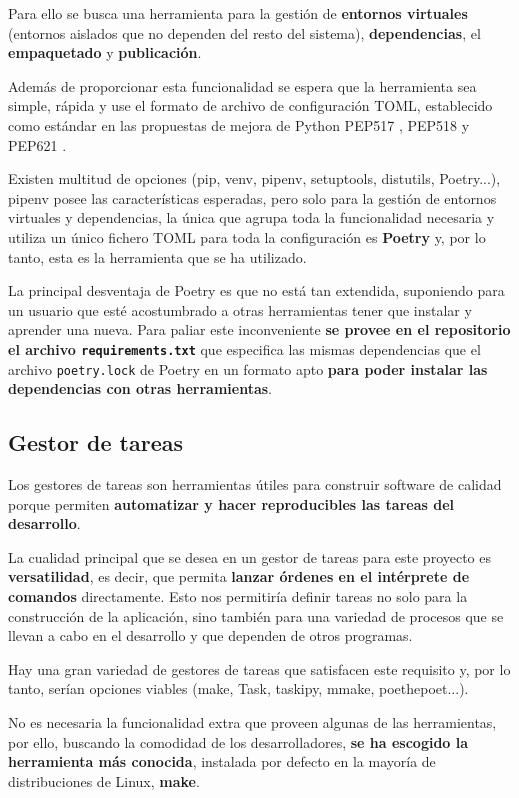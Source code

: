Para ello se busca una herramienta para la gestión de \textbf{entornos virtuales} (entornos aislados que no dependen del resto del sistema), \textbf{dependencias}, el \textbf{empaquetado} y \textbf{publicación}.

Además de proporcionar esta funcionalidad se espera que la herramienta sea simple, rápida y use el formato de archivo de configuración TOML, establecido como estándar en las propuestas de mejora de Python PEP517 \cite{pep517}, PEP518 \cite{pep518} y PEP621 \cite{pep621}.

Existen multitud de opciones (pip, venv, pipenv, setuptools, distutils, Poetry...), pipenv posee las características esperadas, pero solo para la gestión de entornos virtuales y dependencias, la única que agrupa toda la funcionalidad necesaria y utiliza un único fichero TOML para toda la configuración es \textbf{Poetry} y, por lo tanto, esta es la herramienta que se ha utilizado.

La principal desventaja de Poetry es que no está tan extendida, suponiendo para un usuario que esté acostumbrado a otras herramientas tener que instalar y aprender una nueva. Para paliar este inconveniente \textbf{se provee en el repositorio el archivo \texttt{requirements.txt}} que especifica las mismas dependencias que el archivo \texttt{poetry.lock} de Poetry en un formato apto \textbf{para poder instalar las dependencias con otras herramientas}.


\subsection{Gestor de tareas}

Los gestores de tareas son herramientas útiles para construir software de calidad porque permiten \textbf{automatizar y hacer reproducibles las tareas del desarrollo}.  

La cualidad principal que se desea en un gestor de tareas para este proyecto es \textbf{versatilidad}, es decir, que permita \textbf{lanzar órdenes en el intérprete de comandos} directamente.  Esto nos permitiría definir tareas no solo para la construcción de la aplicación, sino también para una variedad de procesos que se llevan a cabo en el desarrollo y que dependen de otros programas.

Hay una gran variedad de gestores de tareas que satisfacen este requisito y, por lo tanto, serían opciones viables (make, Task, taskipy, mmake, poethepoet...).

No es necesaria la funcionalidad extra que proveen algunas de las herramientas, por ello, buscando la comodidad de los desarrolladores, \textbf{se ha escogido la herramienta más conocida}, instalada por defecto en la mayoría de distribuciones de Linux,  \textbf{make}.

